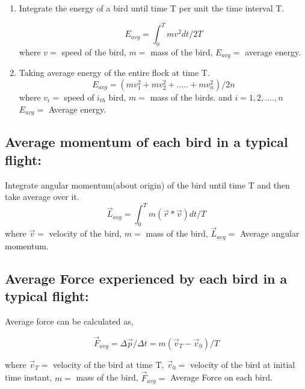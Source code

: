 \documentclass[12pt]{article}
\begin{document}
\begin{enumerate}
    \item Integrate the energy of a bird until time T per unit the time interval T.
    
    $$E_{avg} = \int_{0}^{T} mv^2 dt/2T$$
    where $v = $ speed of the bird,
    $m = $ mass of the bird,
    $E_{avg} =$ average energy.
    
    \item Taking average energy of the entire flock at time T.
    $$ E_{avg} = (mv_1^2 + mv_2^2 + ..... + mv_n^2)/2n $$
    where $v_i = $ speed of $i_{th}$ bird,
    $m = $ mass of the birds.
    and $i = 1,2,....,n$
    $E_{avg} =$ Average energy.    
\end{enumerate}

\subsection{Average momentum of each bird in a typical flight:}

Integrate angular momentum(about origin) of the bird until time T and then take average over it.
$$\vec{L}_{avg} = \int_{0}^{T} m(\vec{r}*\vec{v}) dt/T$$
where $\vec{v} = $ velocity of the bird,
    $m = $ mass of the bird,
    $\vec{L}_{avg} =$ Average angular momentum.
    
    
\subsection{Average Force experienced by each bird in a typical flight:}

Average force can be calculated as,

$$\vec{F}_{avg} = \Delta\vec{p}/\Delta{t} = m(\vec{v}_T - \vec{v}_0)/T$$

where $\vec{v}_T = $ velocity of the bird at time T,
$\vec{v}_0 = $ velocity of the bird at initial time instant,
    $m = $ mass of the bird,
    $\vec{F}_{avg} =$ Average Force on each bird.
\end{document}
